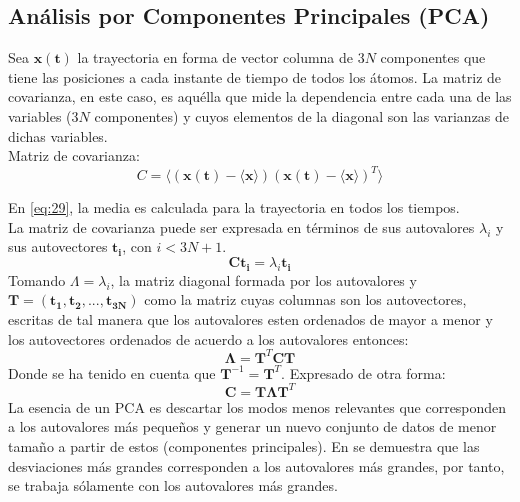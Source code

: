 \subsection{An\'{a}lisis por Componentes Principales (PCA)}
Sea $\mathbf{x(t)}$ la trayectoria en forma de vector columna de $3N$ componentes que tiene las posiciones a cada instante de tiempo de todos los \'{a}tomos. La matriz de covarianza, en este caso, es aqu\'{e}lla que mide la dependencia entre cada una de las variables ($3N$ componentes) y cuyos elementos de la diagonal son las varianzas de dichas variables.\\

Matriz de covarianza:
\begin{equation}\label{eq:28}
C=\langle(\mathbf{x(t)}-\langle\mathbf{x}\rangle)(\mathbf{x(t)}-\langle\mathbf{x}\rangle)^T\rangle
\end{equation}

En \eqref{eq:29}, la media es calculada para la trayectoria en todos los tiempos.\\
La matriz de covarianza puede ser expresada en t\'{e}rminos de sus autovalores  $\lambda_i$ y sus autovectores $\mathbf{t_i}$, con $i<3N+1$.
\begin{equation*}
\mathbf{C}\mathbf{t_i}=\lambda_i\mathbf{t_i}
\end{equation*}
Tomando $\Lambda={\lambda_i}$, la matriz diagonal formada por los autovalores y $\mathbf{T}=\left(\mathbf{t_1},\mathbf{t_2},...,\mathbf{t_{3N}}\right)$ como la matriz cuyas columnas son los autovectores, escritas de tal manera que los autovalores esten ordenados de mayor a menor y los autovectores ordenados de acuerdo a los autovalores entonces:
\begin{equation}\label{eq:29}
\mathbf{\Lambda}=\mathbf{T}^T\mathbf{C}\mathbf{T}
\end{equation}
Donde se ha tenido en cuenta que $\mathbf{T}^{-1}=\mathbf{T}^T$. Expresado de otra forma:
\begin{equation}\label{eq:30}
\mathbf{C}=\mathbf{T}\mathbf{\Lambda} \mathbf{T}^T
\end{equation}
La esencia de un PCA es descartar los modos menos relevantes que corresponden a los autovalores m\'{a}s peque\~{n}os y generar un nuevo conjunto de datos de menor tama\~{n}o a partir de estos (componentes principales). En \cite{Amadei1993} se demuestra que las desviaciones m\'{a}s grandes corresponden a los autovalores m\'{a}s grandes, por tanto, se trabaja s\'{o}lamente con los autovalores m\'{a}s grandes. \\

